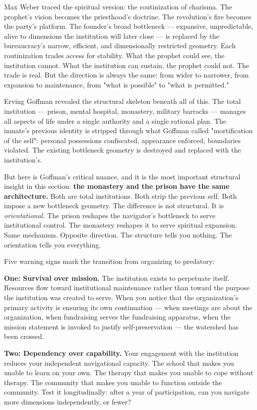 Max Weber traced the spiritual version: the routinization of charisma. The prophet's vision becomes the priesthood's doctrine. The revolution's fire becomes the party's platform. The founder's broad bottleneck — expansive, unpredictable, alive to dimensions the institution will later close — is replaced by the bureaucracy's narrow, efficient, and dimensionally restricted geometry. Each routinization trades access for stability. What the prophet could see, the institution cannot. What the institution can sustain, the prophet could not. The trade is real. But the direction is always the same: from wider to narrower, from expansion to maintenance, from "what is possible" to "what is permitted."


Erving Goffman revealed the structural skeleton beneath all of this. The total institution — prison, mental hospital, monastery, military barracks — manages all aspects of life under a single authority and a single rational plan. The inmate's previous identity is stripped through what Goffman called "mortification of the self": personal possessions confiscated, appearance enforced, boundaries violated. The existing bottleneck geometry is destroyed and replaced with the institution's.


But here is Goffman's critical nuance, and it is the most important structural insight in this section: \textbf{the monastery and the prison have the same architecture.} Both are total institutions. Both strip the previous self. Both impose a new bottleneck geometry. The difference is not structural. It is \textit{orientational.} The prison reshapes the navigator's bottleneck to serve institutional control. The monastery reshapes it to serve spiritual expansion. Same mechanism. Opposite direction. The structure tells you nothing. The orientation tells you everything.


Five warning signs mark the transition from organizing to predatory:


\textbf{One: Survival over mission.} The institution exists to perpetuate itself. Resources flow toward institutional maintenance rather than toward the purpose the institution was created to serve. When you notice that the organization's primary activity is ensuring its own continuation — when meetings are about the organization, when fundraising serves the fundraising apparatus, when the mission statement is invoked to justify self-preservation — the watershed has been crossed.


\textbf{Two: Dependency over capability.} Your engagement with the institution reduces your independent navigational capacity. The school that makes you unable to learn on your own. The therapy that makes you unable to cope without therapy. The community that makes you unable to function outside the community. Test it longitudinally: after a year of participation, can you navigate more dimensions independently, or fewer?


